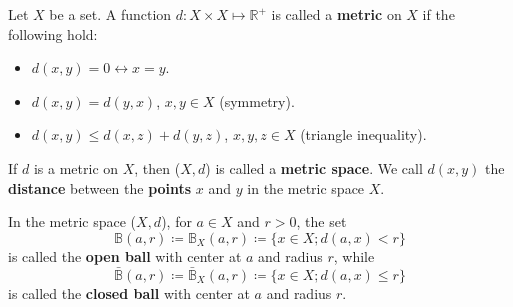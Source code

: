 \begin{definition}\label{def: metric_space}
    Let \(X\) be a set. A function \(d \colon X \times X \mapsto \mathbb{R}^+\) is called
    a \textbf{metric} on \(X\) if the following hold:
    \begin{itemize}
        \item \(d\left(x, y\right) = 0 \leftrightarrow x=y\). 
        \item \(d\left(x, y\right) = d\left(y, x\right)\), \(x, y \in X\) (symmetry). 
        \item \(d\left(x, y\right) \leq d\left(x, z\right) + d\left(y, z\right)\), 
        \(x, y, z \in X\) (triangle inequality). 
    \end{itemize}
\end{definition}

\begin{note}
    If \(d\) is a metric on \(X\), then (\(X, d\)) is called a \textbf{metric space}. We call
    \(d\left(x, y\right)\) the \textbf{distance} between the \textbf{points} \(x\) and \(y\)
    in the metric space \(X\). \par 
    In the metric space (\(X, d\)), for \(a \in X\) and \(r > 0\), the set
    \[
        \mathbb{B}(a, r) \coloneqq \mathbb{B}_X (a, r) \coloneqq \{ x \in X ; d(a, x) < r \}    
    \]
    is called the \textbf{open ball} with center at \(a\) and radius \(r\), while
    \[
        \bar{\mathbb{B}}(a, r) \coloneqq \bar{\mathbb{B}}_X (a, r) \coloneqq \{ x \in X; d(a, x) \leq r \}  
    \]
    is called the \textbf{closed ball} with center at \(a\) and radius \(r\). 
\end{note}

